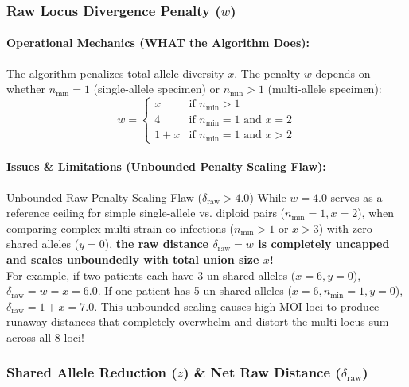 \documentclass[11pt,a4paper]{article}
\begin{document}
\subsubsection{Raw Locus Divergence Penalty (\texorpdfstring{$w$}{w})}
\paragraph{Operational Mechanics (WHAT the Algorithm Does):}
The algorithm penalizes total allele diversity $x$. The penalty $w$ depends on whether $n_{\text{min}} = 1$ (single-allele specimen) or $n_{\text{min}} > 1$ (multi-allele specimen):
\begin{equation}
w = \begin{cases} 
x & \text{if } n_{\text{min}} > 1 \\
4 & \text{if } n_{\text{min}} = 1 \text{ and } x = 2 \\
1 + x & \text{if } n_{\text{min}} = 1 \text{ and } x > 2 
\end{cases}
\end{equation}

\paragraph{Issues \& Limitations (Unbounded Penalty Scaling Flaw):}
\begin{warningbox}{Unbounded Raw Penalty Scaling Flaw ($\delta_{\text{raw}} > 4.0$)}
While $w = 4.0$ serves as a reference ceiling for simple single-allele vs. diploid pairs ($n_{\text{min}}=1, x=2$), when comparing complex multi-strain co-infections ($n_{\text{min}} > 1$ or $x > 3$) with zero shared alleles ($y = 0$), \textbf{the raw distance $\delta_{\text{raw}} = w$ is completely uncapped and scales unboundedly with total union size $x$!}\\
For example, if two patients each have 3 un-shared alleles ($x = 6, y = 0$), $\delta_{\text{raw}} = w = x = \mathbf{6.0}$. If one patient has 5 un-shared alleles ($x = 6, n_{\text{min}} = 1, y = 0$), $\delta_{\text{raw}} = 1 + x = \mathbf{7.0}$. This unbounded scaling causes high-MOI loci to produce runaway distances that completely overwhelm and distort the multi-locus sum across all 8 loci!
\end{warningbox}

\subsubsection{Shared Allele Reduction (\texorpdfstring{$z$}{z}) \& Net Raw Distance (\texorpdfstring{$\delta_{\text{raw}}$}{delta\_raw})}
\end{document}
